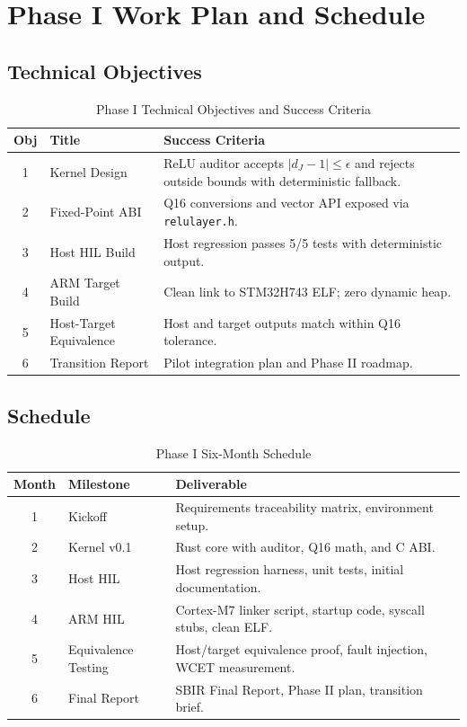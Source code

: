 \documentclass[11pt,oneside]{article}
\begin{document}
\section{Phase I Work Plan and Schedule}

\subsection{Technical Objectives}

\begin{table}[htbp]
\centering
\caption{Phase I Technical Objectives and Success Criteria}
\label{tab:objectives}
\begin{tabular}{@{}clp{7.5cm}@{}}
\toprule
\textbf{Obj} & \textbf{Title} & \textbf{Success Criteria} \\
\midrule
1 & Kernel Design & ReLU auditor accepts $|d_J - 1| \le \epsilon$ and rejects outside bounds with deterministic fallback. \\
2 & Fixed-Point ABI & Q16 conversions and vector API exposed via \texttt{relulayer.h}. \\
3 & Host HIL Build & Host regression passes 5/5 tests with deterministic output. \\
4 & ARM Target Build & Clean link to STM32H743 ELF; zero dynamic heap. \\
5 & Host-Target Equivalence & Host and target outputs match within Q16 tolerance. \\
6 & Transition Report & Pilot integration plan and Phase II roadmap. \\
\bottomrule
\end{tabular}
\end{table}

\subsection{Schedule}

\begin{table}[htbp]
\centering
\caption{Phase I Six-Month Schedule}
\label{tab:schedule}
\begin{tabular}{@{}clp{8cm}@{}}
\toprule
\textbf{Month} & \textbf{Milestone} & \textbf{Deliverable} \\
\midrule
1 & Kickoff & Requirements traceability matrix, environment setup. \\
2 & Kernel v0.1 & Rust core with auditor, Q16 math, and C ABI. \\
3 & Host HIL & Host regression harness, unit tests, initial documentation. \\
4 & ARM HIL & Cortex-M7 linker script, startup code, syscall stubs, clean ELF. \\
5 & Equivalence Testing & Host/target equivalence proof, fault injection, WCET measurement. \\
6 & Final Report & SBIR Final Report, Phase II plan, transition brief. \\
\bottomrule
\end{tabular}
\end{table}
\end{document}
